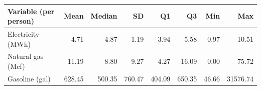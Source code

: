 \begin{tabular}{lrrrrrrr}
\toprule
Variable (per person) & Mean & Median & SD & Q1 & Q3 & Min & Max \\
\midrule
Electricity (MWh) & 4.71 & 4.87 & 1.19 & 3.94 & 5.58 & 0.97 & 10.51 \\
Natural gas (Mcf) & 11.19 & 8.80 & 9.27 & 4.27 & 16.09 & 0.00 & 75.72 \\
Gasoline (gal) & 628.45 & 500.35 & 760.47 & 404.09 & 650.35 & 46.66 & 31576.74 \\
\bottomrule
\end{tabular}
